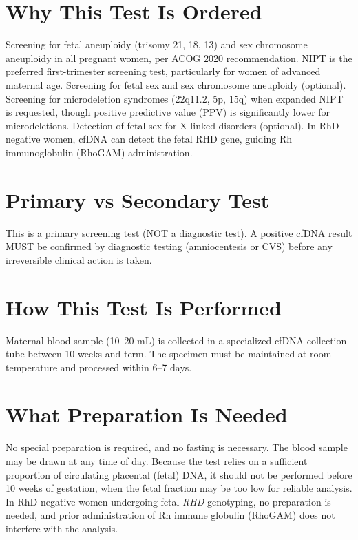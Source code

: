 \section*{Why This Test Is Ordered}
Screening for fetal aneuploidy (trisomy 21, 18, 13) and sex chromosome aneuploidy in all pregnant women, per ACOG 2020 recommendation. NIPT is the preferred first-trimester screening test, particularly for women of advanced maternal age. Screening for fetal sex and sex chromosome aneuploidy (optional). Screening for microdeletion syndromes (22q11.2, 5p, 15q) when expanded NIPT is requested, though positive predictive value (PPV) is significantly lower for microdeletions. Detection of fetal sex for X-linked disorders (optional). In RhD-negative women, cfDNA can detect the fetal RHD gene, guiding Rh immunoglobulin (RhoGAM) administration.

\section*{Primary vs Secondary Test}
This is a primary screening test (NOT a diagnostic test). A positive cfDNA result MUST be confirmed by diagnostic testing (amniocentesis or CVS) before any irreversible clinical action is taken.

\section*{How This Test Is Performed}
Maternal blood sample (10--20 mL) is collected in a specialized cfDNA collection tube between 10 weeks and term. The specimen must be maintained at room temperature and processed within 6--7 days.

\section*{What Preparation Is Needed}
No special preparation is required, and no fasting is necessary. The blood sample may be drawn at any time of day. Because the test relies on a sufficient proportion of circulating placental (fetal) DNA, it should not be performed before 10 weeks of gestation, when the fetal fraction may be too low for reliable analysis. In RhD-negative women undergoing fetal \textit{RHD} genotyping, no preparation is needed, and prior administration of Rh immune globulin (RhoGAM) does not interfere with the analysis.

